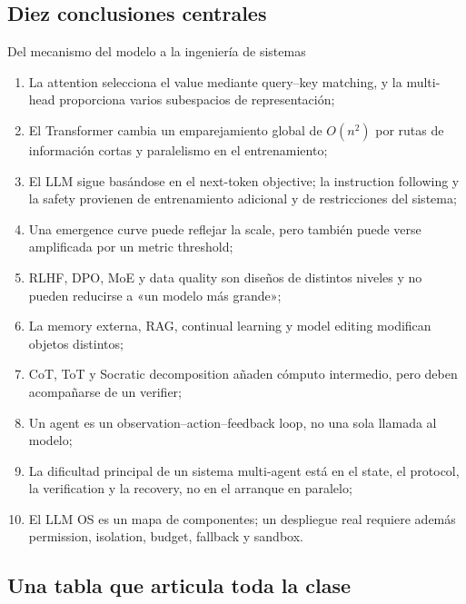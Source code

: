 \documentclass[a4paper]{article}
\begin{document}
\subsection{Diez conclusiones centrales}

\begin{importantbox}{Del mecanismo del modelo a la ingeniería de sistemas}
\begin{enumerate}
  \item La attention selecciona el value mediante query--key matching, y la multi-head proporciona varios subespacios de representación;
  \item El Transformer cambia un emparejamiento global de $O(n^2)$ por rutas de información cortas y paralelismo en el entrenamiento;
  \item El LLM sigue basándose en el next-token objective; la instruction following y la safety provienen de entrenamiento adicional y de restricciones del sistema;
  \item Una emergence curve puede reflejar la scale, pero también puede verse amplificada por un metric threshold;
  \item RLHF, DPO, MoE y data quality son diseños de distintos niveles y no pueden reducirse a «un modelo más grande»;
  \item La memory externa, RAG, continual learning y model editing modifican objetos distintos;
  \item CoT, ToT y Socratic decomposition añaden cómputo intermedio, pero deben acompañarse de un verifier;
  \item Un agent es un observation--action--feedback loop, no una sola llamada al modelo;
  \item La dificultad principal de un sistema multi-agent está en el state, el protocol, la verification y la recovery, no en el arranque en paralelo;
  \item El LLM OS es un mapa de componentes; un despliegue real requiere además permission, isolation, budget, fallback y sandbox.
\end{enumerate}
\end{importantbox}

\subsection{Una tabla que articula toda la clase}
\end{document}
